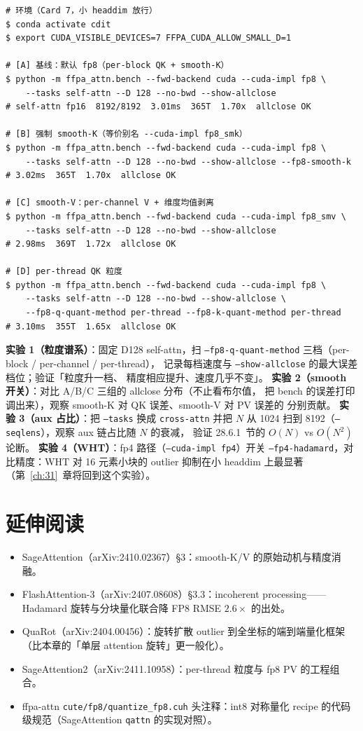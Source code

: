 \begin{lstlisting}[style=console]
# 环境（Card 7，小 headdim 放行）
$ conda activate cdit
$ export CUDA_VISIBLE_DEVICES=7 FFPA_CUDA_ALLOW_SMALL_D=1

# [A] 基线：默认 fp8（per-block QK + smooth-K）
$ python -m ffpa_attn.bench --fwd-backend cuda --cuda-impl fp8 \
    --tasks self-attn --D 128 --no-bwd --show-allclose
# self-attn fp16  8192/8192  3.01ms  365T  1.70x  allclose OK

# [B] 强制 smooth-K（等价别名 --cuda-impl fp8_smk）
$ python -m ffpa_attn.bench --fwd-backend cuda --cuda-impl fp8 \
    --tasks self-attn --D 128 --no-bwd --show-allclose --fp8-smooth-k
# 3.02ms  365T  1.70x  allclose OK

# [C] smooth-V：per-channel V + 维度均值剥离
$ python -m ffpa_attn.bench --fwd-backend cuda --cuda-impl fp8_smv \
    --tasks self-attn --D 128 --no-bwd --show-allclose
# 2.98ms  369T  1.72x  allclose OK

# [D] per-thread QK 粒度
$ python -m ffpa_attn.bench --fwd-backend cuda --cuda-impl fp8 \
    --tasks self-attn --D 128 --no-bwd --show-allclose \
    --fp8-q-quant-method per-thread --fp8-k-quant-method per-thread
# 3.10ms  355T  1.65x  allclose OK
\end{lstlisting}

\textbf{实验 1（粒度谱系）}：固定 D128 self-attn，扫
\texttt{--fp8-q-quant-method} 三档（per-block / per-channel / per-thread），
记录每档速度与 \texttt{--show-allclose} 的最大误差档位；验证「粒度升一档、
精度相应提升、速度几乎不变」。
\textbf{实验 2（smooth 开关）}：对比 A/B/C 三组的 allclose 分布（不止看布尔值，
把 bench 的误差打印调出来），观察 smooth-K 对 QK 误差、smooth-V 对 PV 误差的
分别贡献。
\textbf{实验 3（aux 占比）}：把 \texttt{--tasks} 换成 \texttt{cross-attn} 并把
$N$ 从 1024 扫到 8192（\texttt{--seqlens}），观察 aux 链占比随 $N$ 的衰减，
验证 28.6.1~节的 $O(N)$ vs $O(N^2)$ 论断。
\textbf{实验 4（WHT）}：fp4 路径（\texttt{--cuda-impl fp4}）开关
\texttt{--fp4-hadamard}，对比精度：WHT 对 16 元素小块的 outlier 抑制在小 headdim
上最显著（第~\ref{ch:31}~章将回到这个实验）。

\section*{延伸阅读}
\begin{itemize}[itemsep=0pt,topsep=2pt]
  \item SageAttention（arXiv:2410.02367）\S3：smooth-K/V 的原始动机与精度消融。
  \item FlashAttention-3（arXiv:2407.08608）\S3.3：incoherent processing——
        Hadamard 旋转与分块量化联合降 FP8 RMSE $2.6\times$ 的出处。
  \item QuaRot（arXiv:2404.00456）：旋转扩散 outlier 到全坐标的端到端量化框架
        （比本章的「单层 attention 旋转」更一般化）。
  \item SageAttention2（arXiv:2411.10958）：per-thread 粒度与 fp8 PV 的工程组合。
  \item ffpa-attn \texttt{cute/fp8/quantize\_fp8.cuh} 头注释：int8 对称量化
        recipe 的代码级规范（SageAttention \texttt{qattn} 的实现对照）。
\end{itemize}
